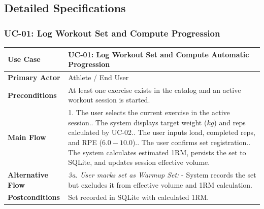 \subsection{Detailed Specifications}

\subsubsection{UC-01: Log Workout Set and Compute Progression}
\begin{table}[h!]
\centering
\small
\begin{tabularx}{\textwidth}{l X}
\toprule
\textbf{Use Case} & \textbf{UC-01: Log Workout Set and Compute Automatic Progression} \\
\midrule
\textbf{Primary Actor} & Athlete / End User \\
\textbf{Preconditions} & At least one exercise exists in the catalog and an active workout session is started. \\
\textbf{Main Flow} & 
1. The user selects the current exercise in the active session.\newline
2. The system displays target weight ($kg$) and reps calculated by UC-02.\newline
3. The user inputs load, completed reps, and RPE ($6.0 - 10.0$).\newline
4. The user confirms set registration.\newline
5. The system calculates estimated 1RM, persists the set to SQLite, and updates session effective volume. \\
\textbf{Alternative Flow} & 
\textit{3a. User marks set as Warmup Set:}\newline
- System records the set but excludes it from effective volume and 1RM calculation. \\
\textbf{Postconditions} & Set recorded in SQLite with calculated 1RM. \\
\bottomrule
\end{tabularx}
\end{table}

